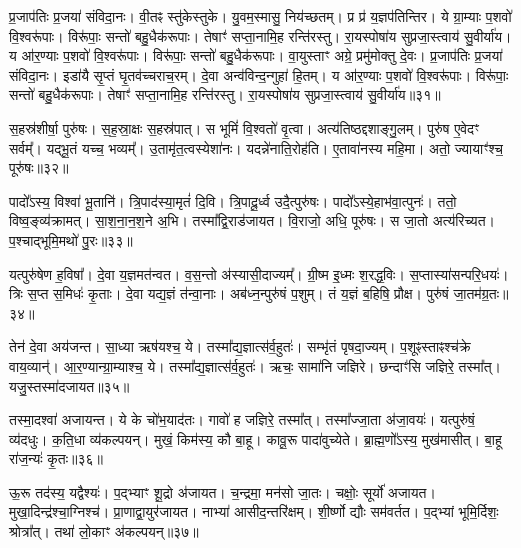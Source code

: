 प्र॒जाप॑तिः प्र॒जया॑ संविदा॒नः। 
वी॒तꣴ स्तु॑केस्तुके। 
यु॒वम॒स्मासु॒ निय॑च्छतम्। 
प्र प्र॑ य॒ज्ञप॑तिन्तिर। 
ये ग्रा॒म्याः प॒शवो॑ वि॒श्वरू॑पाः। 
विरू॑पाः॒ सन्तो॑ बहु॒धैक॑रूपाः। 
तेषाꣳ॑ सप्ता॒नामि॒ह रन्ति॑रस्तु। 
रा॒यस्पोषा॑य सुप्रजा॒स्त्वाय॑ सु॒वीर्या॑य। 
य आ॑र॒ण्याः प॒शवो॑ वि॒श्वरू॑पाः। 
विरू॑पाः॒ सन्तो॑ बहु॒धैक॑रूपाः। 
वा॒युस्ताꣳ अग्रे॒ प्रमु॑मोक्तु दे॒वः। 
प्र॒जाप॑तिः प्र॒जया॑ संविदा॒नः। 
इडा॑यै सृ॒प्तं घृ॒तव॑च्चराच॒रम्। 
दे॒वा अन्व॑विन्द॒न्गुहा॑ हि॒तम्। 
य आ॑र॒ण्याः प॒शवो॑ वि॒श्वरू॑पाः। 
विरू॑पाः॒ सन्तो॑ बहु॒धैक॑रूपाः। 
तेषाꣳ॑ सप्ता॒नामि॒ह रन्ति॑रस्तु। 
रा॒यस्पोषा॑य सुप्रजा॒स्त्वाय॑ सु॒वीर्या॑य॥३१॥
\anuvakamend[आ॒त्मा जना॑नां  विकु॒र्वन्तं॑  विप॒श्चिं प्र॒जानां᳚ वसु॒धानीं᳚  वि॒राजं॒ चर॑न्तं॒  गोम॑तीं मे॒ निय॑च्छ॒त्वेक॑चक्रं॒ व्यो॑मन्मा॒यया॑ दे॒व एक॑रूपा अ॒ष्टौ च॑]

स॒हस्र॑शीर्\mbox{}षा॒ पुरु॑षः। 
स॒ह॒स्रा॒क्षः स॒हस्र॑पात्। 
स भूमिं॑ वि॒श्वतो॑ वृ॒त्वा। 
अत्य॑तिष्ठद्दशाङ्गु॒लम्। 
पुरु॑ष ए॒वेदꣳ सर्वम्᳚। 
यद्भू॒तं यच्च॒ भव्यम्᳚। 
उ॒तामृ॑त॒त्वस्येशा॑नः। 
यदन्ने॑नाति॒रोह॑ति। 
ए॒तावा॑नस्य महि॒मा। 
अतो॒ ज्यायाꣳ॑श्च॒ पूरु॑षः॥३२॥

पादो᳚ऽस्य॒ विश्वा॑ भू॒तानि॑। 
त्रि॒पाद॑स्या॒मृतं॑ दि॒वि। 
त्रि॒पादू॒र्ध्व उदै॒त्पुरु॑षः। 
पादो᳚ऽस्ये॒हाभ॑वा॒त्पुनः॑। 
ततो॒ विष्व॒ङ्व्य॑क्रामत्। 
सा॒श॒ना॒न॒श॒ने अ॒भि। 
तस्मा᳚द्वि॒राड॑जायत। 
वि॒राजो॒ अधि॒ पूरु॑षः। 
स जा॒तो अत्य॑रिच्यत। 
प॒श्चाद्भूमि॒मथो॑ पु॒रः॥३३॥

यत्पुरु॑षेण ह॒विषा᳚। 
दे॒वा य॒ज्ञमत॑न्वत। 
व॒स॒न्तो अ॑स्यासी॒दाज्यम्᳚। 
ग्री॒ष्म इ॒ध्मः  श॒रद्ध॒विः। 
स॒प्तास्या॑सन्परि॒\-धयः॑। 
त्रिः स॒प्त स॒मिधः॑ कृ॒ताः। 
दे॒वा यद्य॒ज्ञं त॑न्वा॒नाः। 
अब॑ध्न॒न्पुरु॑षं प॒शुम्। 
तं य॒ज्ञं ब॒\ar{}हिषि॒ प्रौक्ष\sn{}। 
पुरु॑षं जा॒तम॑ग्र॒तः॥३४॥

तेन॑ दे॒वा अय॑जन्त। 
सा॒ध्या ऋष॑यश्च॒ ये। 
तस्मा᳚द्य॒ज्ञात्स॑र्व॒हुतः॑। 
सम्भृ॑तं पृषदा॒ज्यम्। 
प॒शूꣴस्ताꣴश्च॑क्रे वाय॒व्यान्॑। 
आ॒र॒ण्यान्ग्रा॒म्याश्च॒ ये। 
तस्मा᳚द्य॒ज्ञात्स॑र्व॒हुतः॑। 
ऋचः॒ सामा॑नि जज्ञिरे। 
छन्दाꣳ॑सि जज्ञिरे॒ तस्मा᳚त्। 
यजु॒स्तस्मा॑दजायत॥३५॥

तस्मा॒दश्वा॑ अजायन्त। 
ये के चो॑भ॒याद॑तः। 
गावो॑ ह जज्ञिरे॒ तस्मा᳚त्। 
तस्मा᳚ज्जा॒ता अ॑जा॒वयः॑। 
यत्पुरु॑षं॒ व्य॑दधुः। 
क॒ति॒धा व्य॑कल्पयन्। 
मुखं॒ किम॑स्य॒ कौ बा॒हू। 
कावू॒रू पादा॑वुच्येते। 
ब्रा॒ह्म॒णो᳚ऽस्य॒ मुख॑मासीत्। 
बा॒हू रा॑ज॒न्यः॑ कृ॒तः॥३६॥

ऊ॒रू तद॑स्य॒ यद्वैश्यः॑। 
प॒द्भ्याꣳ शू॒द्रो अ॑जायत। 
च॒न्द्रमा॒ मन॑सो जा॒तः। 
चक्षोः॒ सूर्यो॑ अजायत। 
मुखा॒दिन्द्र॑श्चा॒ग्निश्च॑। 
प्रा॒णाद्वा॒युर॑जायत। 
नाभ्या॑ आसीद॒न्तरि॑क्षम्। 
शी॒र्ष्णो द्यौः सम॑वर्तत। 
प॒द्भ्यां भूमि॒र्दिशः॒ श्रोत्रा᳚त्। 
तथा॑ लो॒काꣳ अ॑कल्पयन्॥३७॥

